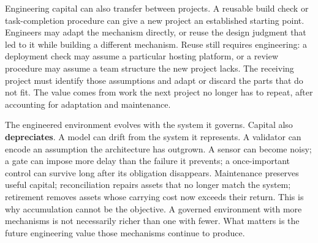 

Engineering capital can also transfer between projects. A reusable build check or task-completion procedure can give a new project an established starting point. Engineers may adapt the mechanism directly, or reuse the design judgment that led to it while building a different mechanism. Reuse still requires engineering: a deployment check may assume a particular hosting platform, or a review procedure may assume a team structure the new project lacks. The receiving project must identify those assumptions and adapt or discard the parts that do not fit. The value comes from work the next project no longer has to repeat, after accounting for adaptation and maintenance.


The engineered environment evolves with the system it governs. Capital also \textbf{depreciates}. A model can drift from the system it represents. A validator can encode an assumption the architecture has outgrown. A sensor can become noisy; a gate can impose more delay than the failure it prevents; a once-important control can survive long after its obligation disappears. Maintenance preserves useful capital; reconciliation repairs assets that no longer match the system; retirement removes assets whose carrying cost now exceeds their return. This is why accumulation cannot be the objective. A governed environment with more mechanisms is not necessarily richer than one with fewer. What matters is the future engineering value those mechanisms continue to produce.

